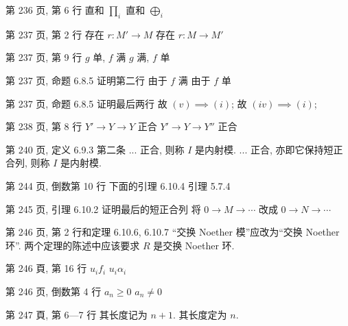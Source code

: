 \documentclass{AJerrata}
\begin{document}
\begin{Errata}
        \item[第 236 页, 第 6 行]
        \Orig 直和 $\prod_i$
        \Corr 直和 $\bigoplus_i$
        
        \item[第 237 页, 第 2 行]
        \Orig 存在 $r: M' \to M$
        \Corr 存在 $r: M \to M'$

		\item[第 237 页, 第 9 行]
		\Orig $g$ 单, $f$ 满
		\Corr $g$ 满, $f$ 单
	
        \item[第 237 页, 命题 6.8.5 证明第二行]
        \Orig 由于 $f$ 满
        \Corr 由于 $f$ 单
        
        \item[第 237 页, 命题 6.8.5 证明最后两行]
        \Orig 故 $(v) \implies (i)$;
        \Corr 故 $(iv) \implies (i)$;
        
        \item[第 238 页, 第 8 行]
        \Orig $Y' \to Y \to Y$ 正合
        \Corr $Y' \to Y \to Y''$ 正合
        
       \item[第 240 页, 定义 6.9.3 第二条]
       \Orig ... 正合, 则称 $I$ 是内射模.
       \Corr ... 正合, 亦即它保持短正合列, 则称 $I$ 是内射模.
        
   		\item[第 244 页, 倒数第 10 行]
        \Orig 下面的引理 6.10.4
        \Corr 引理 5.7.4
        
        \item[第 245 页, 引理 6.10.2 证明最后的短正合列]
        将 $0 \to M \to \cdots$ 改成 $0 \to N \to \cdots$
        
   		\item[第 246 页, 第 2 行和定理 6.10.6, 6.10.7]
		``交换 Noether 模''应改为``交换 Noether 环''. 两个定理的陈述中应该要求 $R$ 是交换 Noether 环.
        
        \item[第 246 頁, 第 16 行]
        \Orig $u_i f_i$
        \Corr $u_i \alpha_i$

		\item[第 246 页, 倒数第 4 行]
		\Orig $a_n \geq 0$
		\Corr $a_n \neq 0$

        \item[第 247 頁, 第 6---7 行]
        \Orig 其长度记为 $n+1$.
        \Corr 其长度定为 $n$.


\end{Errata}
\end{document}
